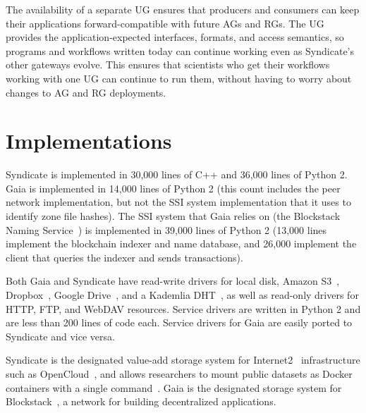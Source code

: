 The availability of a separate UG ensures that producers and consumers can keep
their applications forward-compatible with future AGs and RGs.  The UG provides
the application-expected interfaces, formats, and access semantics, so
programs and workflows written today can continue working even as Syndicate's
other gateways evolve.  This ensures that scientists who get their workflows
working with one UG can continue to run them, without having to worry about
changes to AG and RG deployments.

\section{Implementations}

Syndicate is implemented in 30,000 lines of C++ and 36,000 lines of Python 2.
Gaia is implemented in 14,000 lines of Python 2 (this count includes the peer 
network implementation, but not the SSI system implementation that it uses to
identify zone file hashes).  The SSI system that Gaia relies on (the Blockstack
Naming Service~\cite{bns}) is
implemented in 39,000 lines of Python 2 (13,000 lines implement the
blockchain indexer and name database, and 26,000 implement the client that
queries the indexer and sends transactions).

Both Gaia and Syndicate have read-write drivers for local disk, Amazon S3~\cite{s3}, 
Dropbox~\cite{dropbox}, Google Drive~\cite{gdrive}, and a Kademlia
DHT~\cite{kademlia}, as well as read-only drivers for HTTP, FTP, and WebDAV
resources.  Service drivers are written in Python 2 and are less than 200 lines of code
each.  Service drivers for Gaia are easily ported to Syndicate and vice versa.

Syndicate is the designated value-add storage system for
Internet2~\cite{internet2} infrastructure such as OpenCloud~\cite{opencloud},
and allows researchers to mount public datasets as Docker~\cite{docker}
containers with a single command~\cite{sdm}.  Gaia is the designated
storage system for Blockstack~\cite{blockstack}, a network for building
decentralized applications.
